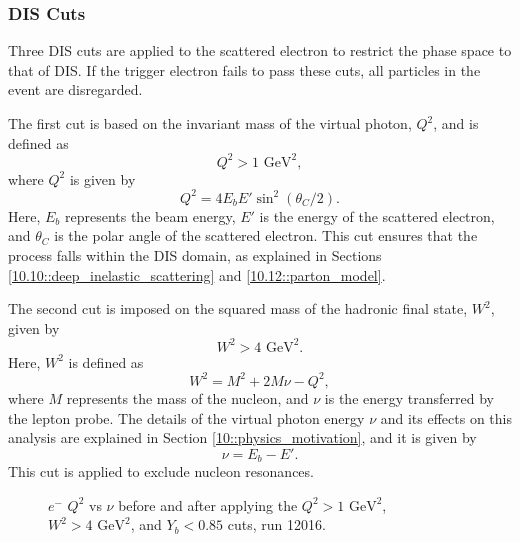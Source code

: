 \subsubsection{DIS Cuts}
\label{13.23::dis_cuts}
    Three DIS cuts are applied to the scattered electron to restrict the phase space to that of DIS.
    If the trigger electron fails to pass these cuts, all particles in the event are disregarded.

    The first cut is based on the invariant mass of the virtual photon, $Q^2$, and is defined as
    \begin{equation*}
        Q^2 > 1 \text{ GeV}^2,
    \end{equation*}
    where $Q^2$ is given by
    \begin{equation}
        Q^2 = 4E_bE'\sin^2(\theta_C/2).
        \label{eq::13.23::q2}
    \end{equation}
    Here, $E_b$ represents the beam energy, $E'$ is the energy of the scattered electron, and $\theta_C$ is the polar angle of the scattered electron.
    This cut ensures that the process falls within the DIS domain, as explained in Sections \ref{10.10::deep_inelastic_scattering} and \ref{10.12::parton_model}.

    The second cut is imposed on the squared mass of the hadronic final state, $W^2$, given by
    \begin{equation*}
        W^2 > 4 \text{ GeV}^2.
    \end{equation*}
    Here, $W^2$ is defined as
    \begin{equation*}
    W^2 = M^2 + 2M\nu - Q^2,
    \end{equation*}
    where $M$ represents the mass of the nucleon, and $\nu$ is the energy transferred by the lepton probe.
    The details of the virtual photon energy $\nu$ and its effects on this analysis are explained in Section \ref{10::physics_motivation}, and it is given by
    \begin{equation}
        \nu = E_b - E'.
        \label{eq::13.23::nu}
    \end{equation}
    This cut is applied to exclude nucleon resonances.

    \begin{figure}[b!]
        \caption[$Q^2$ vs $\nu$ comparison]
        {$e^-$ $Q^2$ vs $\nu$ before and after applying the $Q^2 > 1 \text{ GeV}^2$, $W^2 > 4 \text{ GeV}^2$, and $Y_b < 0.85$ cuts, run 12016.}
        \label{fig::13.23::q2_vs_nu}
    \end{figure}

